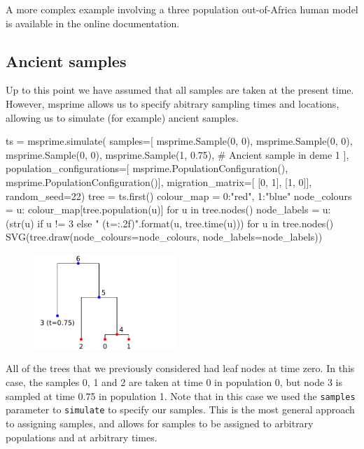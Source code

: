 \documentclass[graybox]{svmult}
\newcommand{\includenbimage}[1]{\begin{center}\texttt{[image: \#1]}\end{center}}
\begin{document}
A more complex example involving a three population out-of-Africa human
model is available in the online documentation.

\subsection{Ancient samples}\label{ancient-samples}

Up to this point we have assumed that all samples are taken at the
present time. However, msprime allows us to specify abitrary sampling
times and locations, allowing us to simulate (for example) ancient
samples.

\begin{pythoncode}
ts = msprime.simulate(
    samples=[
        msprime.Sample(0, 0), msprime.Sample(0, 0), msprime.Sample(0, 0),
        msprime.Sample(1, 0.75), # Ancient sample in deme 1
    ],
    population_configurations=[
        msprime.PopulationConfiguration(),
        msprime.PopulationConfiguration()],
    migration_matrix=[
        [0, 1],
        [1, 0]],
    random_seed=22)
tree = ts.first()
colour_map = {0:"red", 1:"blue"}
node_colours = {u: colour_map[tree.population(u)] for u in tree.nodes()}
node_labels = {
    u: (str(u) if u != 3 else "{} (t={:.2f})".format(u, tree.time(u)))
    for u in tree.nodes()}
SVG(tree.draw(node_colours=node_colours, node_labels=node_labels))
\end{pythoncode}

\begin{figure}
  \begin{center}
    \includegraphics[width=0.48\textwidth]{images/simulations_45_0.pdf}
  \end{center}
\end{figure}

All of the trees that we previously considered had leaf nodes at time
zero. In this case, the samples 0, 1 and 2 are taken at time 0 in
population 0, but node 3 is sampled at time 0.75 in population 1. Note
that in this case we used the \texttt{samples} parameter to
\texttt{simulate} to specify our samples. This is the most general
approach to assigning samples, and allows for samples to be assigned to
arbitrary populations and at arbitrary times.
\end{document}
